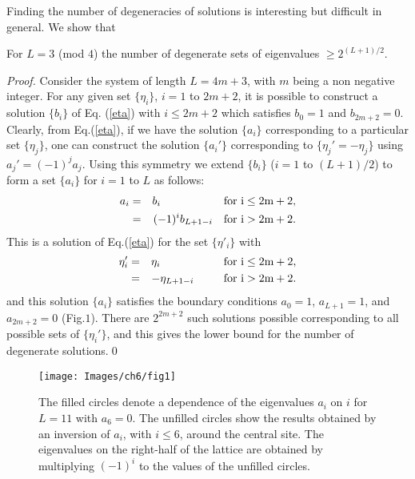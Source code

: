 \documentclass[11pt,a4paper]{book}
\begin{document}
%
Finding the number of  degeneracies of solutions is interesting but
difficult in general. We show that 
\begin{lemma}
For $L=3$ (mod $4$) the number of degenerate sets of eigenvalues $\ge2^{(L+1)/2}$.
\end{lemma}
\begin{proof}
Consider the system of length $L=4m+3$, with $m$ being a non negative
integer. For any given set $\{\eta_i\}$, $i=1$ to $2m+2$, it is
possible to construct a solution $\{b_i\}$ of Eq. (\ref{eta}) with
$i\le2m+2$ which satisfies $b_0=1$ and $b_{2m+2}=0$.
Clearly, from  Eq.(\ref{eta}), if we have the solution $\{a_i\}$ 
corresponding to a particular set $\{\eta_j\}$, one can construct the 
solution $\{a_i'\}$ corresponding to $\{ \eta_j'= 
-\eta_j\}$  using 
$a_j' = (-1)^j a_j$. Using this symmetry we
extend $\{b_i\}$ ($i = 1 $ to $(L+1)/2$) to form a set $\{a_i\}$ for 
$i = 1$ to $L$  as follows:
\begin{eqnarray}
a_{i}&=&b_{i} \rm{~~~~~~~~~~~~~~~~~for~}i\le 2m+2, \\
     &=&(-1)^{i}b_{L+1-i} \rm{~~~for~}i>2m+2. 
\end{eqnarray}
This is a solution of Eq.(\ref{eta}) for the set $\{\eta'_i\}$ with 
\begin{eqnarray}
\eta_{i}'&=&\eta_{i} \rm{~~~~~~~~~~~~~~~~~for~} i\le 2m+2, \\
         &=&-\eta_{L+1-i} \rm{~~~~~~~~for~}i>2m+2.
\end{eqnarray}
and this solution $\{a_i\}$ satisfies the boundary conditions
$a_0=1$, $a_{L+1}=1$, and $a_{2m+2}=0$ (Fig.$1$). There are
$2^{2m+2}$ such solutions possible corresponding to all possible sets
of $\{\eta_i'\}$, and this gives the lower bound for the number of
degenerate solutions.\qed
\end{proof}

\begin{figure}
   \begin{center}
    \texttt{[image: Images/ch6/fig1]}
    \caption{The filled circles denote a dependence of the eigenvalues
$a_i$ on $i$ for $L=11$ with $a_6=0$. The unfilled circles show the
results obtained by an inversion of $a_i$, with $i\le6$, around
the central site. The eigenvalues on the right-half of the lattice are obtained by
multiplying $(-1)^i$ to the values of the unfilled circles.}
    \end{center}
    \label{figure1}
\end{figure}
\end{document}
